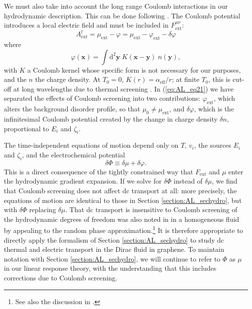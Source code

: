 We must also take into account the long range Coulomb interactions in our hydrodynamic description.   This can be done following \cite{muller_collective_2008}.   The Coulomb potential introduces a local electric field and must be included in $F_{\mathrm{ext}}^{\mu\nu}$: \begin{equation}
A^t_{\mathrm{ext}} = \mu_{\mathrm{ext}}-\varphi = \mu_{\mathrm{ext}} - \varphi_{\mathrm{ext}} - \delta \varphi   \label{eq:AL_eq21}
\end{equation}
where \begin{equation}
\varphi(\mathbf{x}) = \int \mathrm{d}^2\mathbf{y}\; K(\mathbf{x}-\mathbf{y}) \; n(\mathbf{y}),
\end{equation}
with $K$ a Coulomb kernel whose specific form \cite{hwang_screening-induced_2009} is not necessary for our purposes, and the $n$ the charge density.    At $T_0=0$,   $K(r) = \alpha_{\mathrm{eff}}/r$;  at finite $T_0$, this is cut-off at long wavelengths due to thermal screening \cite{hwang_screening-induced_2009}.    In (\ref{eq:AL_eq21}) we have separated the effects of Coulomb screening into two contributions:  $\varphi_{\mathrm{ext}}$, which alters the background disorder profile, so that $\mu_0 \ne \mu_{\mathrm{ext}}$, and $\delta\varphi$, which is the infinitesimal Coulomb potential created by the change in charge density $\delta n$, proportional to $E_i$ and $\zeta_i$. 

The time-independent equations of motion depend only on $ T$, $ v_i$,  the sources $ E_i$ and $ \zeta_i$, and the electrochemical potential\begin{equation}
\delta \Phi \equiv \delta \mu +  \delta \varphi .
\end{equation}
This is a direct consequence of the tightly constrained way that $F_{\mathrm{ext}}$ and $\mu$ enter the hydrodynamic gradient expansion.    If we solve for $\delta\Phi$ instead of $\delta\mu$,  we find that Coulomb screening does not affect dc transport at all:  more precisely, the equations of motion are identical to those in Section \ref{section:AL_sechydro}, but with $\delta \Phi$ replacing $\delta \mu$.   That dc transport is insensitive to Coulomb screening of the hydrodynamic degrees of freedom was also noted in \cite{muller_collective_2008} in a homogeneous fluid by appealing to the random phase approximation.\footnote{See also the discussion in \cite{pines_theory_1994, lucas_memory_2015}.}    It is therefore appropriate to directly apply the formalism of Section \ref{section:AL_sechydro} to study dc thermal and electric transport in the Dirac fluid in graphene.   To maintain notation with Section \ref{section:AL_sechydro},  we will continue to  refer to $\Phi$ as $\mu$ in our linear response theory, with the understanding that this includes corrections due to Coulomb screening.

